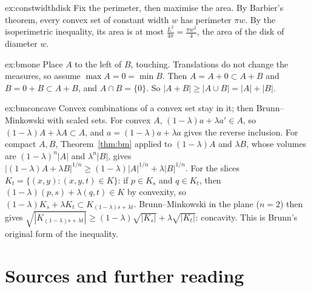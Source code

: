 \begin{solution}{ex:constwidthdisk}
\idea Fix the perimeter, then maximise the area.
\writeup By Barbier's theorem, every convex set of constant width $w$ has perimeter $\pi w$. By the isoperimetric inequality, its area is at most
$\frac{L^2}{4\pi}=\frac{\pi w^2}4$, the area of the disk of diameter $w$.
\end{solution}

\begin{solution}{ex:bmone}
\idea Place $A$ to the left of $B$, touching.
\writeup Translations do not change the measures, so assume $\max A=0=\min B$. Then $A=A+0\subset A+B$ and $B=0+B\subset A+B$, and $A\cap B=\{0\}$. So
$|A+B|\ge|A\cup B|=|A|+|B|$.
\end{solution}

\begin{solution}{ex:bmconcave}
\idea Convex combinations of a convex set stay in it; then Brunn--Minkowski with scaled sets.
\writeup For convex $A$, $(1-\lambda)a+\lambda a'\in A$, so $(1-\lambda)A+\lambda A\subset A$, and $a=(1-\lambda)a+\lambda a$ gives the reverse inclusion. For compact $A,B$,
Theorem~\ref{thm:bm} applied to $(1-\lambda)A$ and $\lambda B$, whose volumes are $(1-\lambda)^n|A|$ and $\lambda^n|B|$, gives
$|(1-\lambda)A+\lambda B|^{1/n}\ge(1-\lambda)|A|^{1/n}+\lambda|B|^{1/n}$. For the slices $K_t=\{(x,y):(x,y,t)\in K\}$: if $p\in K_s$ and $q\in K_t$, then
$(1-\lambda)(p,s)+\lambda(q,t)\in K$ by convexity, so $(1-\lambda)K_s+\lambda K_t\subset K_{(1-\lambda)s+\lambda t}$. Brunn--Minkowski in the plane ($n=2$) then gives
$\sqrt{|K_{(1-\lambda)s+\lambda t}|}\ge(1-\lambda)\sqrt{|K_s|}+\lambda\sqrt{|K_t|}$: concavity. This is Brunn's original form of the inequality.
\end{solution}

\section*{Sources and further reading}

